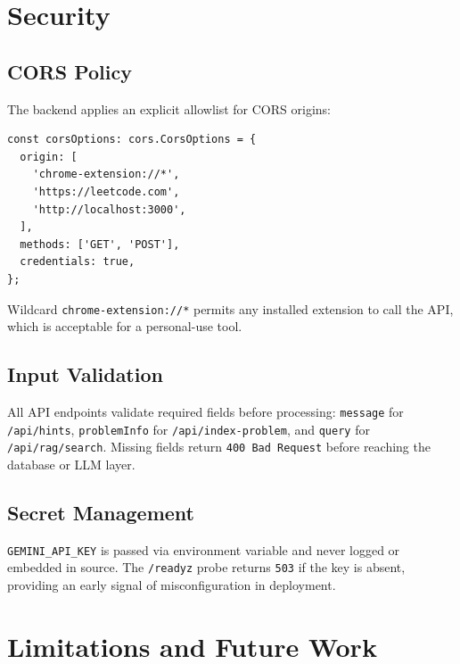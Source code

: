 \documentclass[11pt,a4paper]{article}
\begin{document}
\section{Security}

\subsection{CORS Policy}

The backend applies an explicit allowlist for CORS origins:

\begin{lstlisting}[style=ts, caption={corsOptions in server.ts}]
const corsOptions: cors.CorsOptions = {
  origin: [
    'chrome-extension://*',
    'https://leetcode.com',
    'http://localhost:3000',
  ],
  methods: ['GET', 'POST'],
  credentials: true,
};
\end{lstlisting}

Wildcard \texttt{chrome-extension://*} permits any installed extension to call
the API, which is acceptable for a personal-use tool.

\subsection{Input Validation}

All API endpoints validate required fields before processing:
\texttt{message} for \texttt{/api/hints}, \texttt{problemInfo} for
\texttt{/api/index-problem}, and \texttt{query} for \texttt{/api/rag/search}.
Missing fields return \texttt{400 Bad Request} before reaching the database or
LLM layer.

\subsection{Secret Management}

\texttt{GEMINI\_API\_KEY} is passed via environment variable and never logged or
embedded in source.  The \texttt{/readyz} probe returns \texttt{503} if the key
is absent, providing an early signal of misconfiguration in deployment.

\section{Limitations and Future Work}
\end{document}
